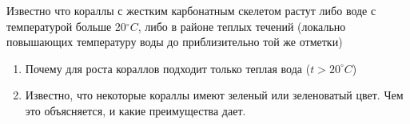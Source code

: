 
Известно что кораллы с жестким карбонатным скелетом растут либо воде с температурой больше 20$^{\circ}C$, либо в районе теплых течений (локально повышающих температуру воды до приблизительно той же отметки)

\begin{enumerate}
    \item Почему для роста кораллов подходит только теплая вода ($t> 20^{\circ}C$)
    \item Известно, что некоторые кораллы имеют зеленый или зеленоватый цвет. Чем это объясняется, и какие преимущества дает.
\end{enumerate}

